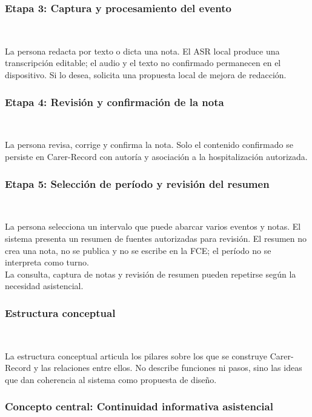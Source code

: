 \subsubsection*{Etapa 3: Captura y procesamiento del evento} ~

La persona redacta por texto o dicta una nota. El ASR local produce una transcripción editable; el audio y el texto no confirmado permanecen en el dispositivo. Si lo desea, solicita una propuesta local de mejora de redacción.\\

\subsubsection*{Etapa 4: Revisión y confirmación de la nota} ~

La persona revisa, corrige y confirma la nota. Solo el contenido confirmado se persiste en Carer-Record con autoría y asociación a la hospitalización autorizada.\\

\subsubsection*{Etapa 5: Selección de período y revisión del resumen} ~

La persona selecciona un intervalo que puede abarcar varios eventos y notas. El sistema presenta un resumen de fuentes autorizadas para revisión. El resumen no crea una nota, no se publica y no se escribe en la FCE; el período no se interpreta como turno.\\

La consulta, captura de notas y revisión de resumen pueden repetirse según la necesidad asistencial.

\subsubsection*{Estructura conceptual} ~

La estructura conceptual articula los pilares sobre los que se construye Carer-Record y las relaciones entre ellos. No describe funciones ni pasos, sino las ideas que dan coherencia al sistema como propuesta de diseño.\\

\subsubsection*{Concepto central: Continuidad informativa asistencial} ~

